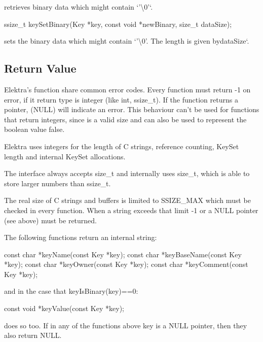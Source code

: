 retrieves binary data which might contain `'\textbackslash{}0'`. \begin{DoxyVerb}    ssize_t keySetBinary(Key *key, const void *newBinary, size_t dataSize);
\end{DoxyVerb}


sets the binary data which might contain `'\textbackslash{}0'{\ttfamily . The length is given by}data\+Size`.

\subsection*{Return Value}

Elektra's function share common error codes. Every function must return {\ttfamily -\/1} on error, if it return type is integer (like {\ttfamily int}, {\ttfamily ssize\+\_\+t}). If the function returns a pointer, {} ({\ttfamily N\+U\+L\+L}) will indicate an error. This behaviour can't be used for functions that return integers, since {} is a valid size and can also be used to represent the boolean value {\ttfamily false}.

Elektra uses integers for the length of C strings, reference counting, {\ttfamily Key\+Set} length and internal {\ttfamily Key\+Set} allocations.

The interface always accepts {\ttfamily size\+\_\+t} and internally uses {\ttfamily size\+\_\+t}, which is able to store larger numbers than {\ttfamily ssize\+\_\+t}.

The real size of C strings and buffers is limited to {\ttfamily S\+S\+I\+Z\+E\+\_\+\+M\+A\+X} which must be checked in every function. When a string exceeds that limit {\ttfamily -\/1} or a {\ttfamily N\+U\+L\+L} pointer (see above) must be returned.

The following functions return an internal string\+: \begin{DoxyVerb}    const char *keyName(const Key *key);
    const char *keyBaseName(const Key *key);
    const char *keyOwner(const Key *key);
    const char *keyComment(const Key *key);
\end{DoxyVerb}


and in the case that {\ttfamily key\+Is\+Binary(key)==0}\+: \begin{DoxyVerb}    const void *keyValue(const Key *key);
\end{DoxyVerb}


does so too. If in any of the functions above {\ttfamily key} is a {\ttfamily N\+U\+L\+L} pointer, then they also return {\ttfamily N\+U\+L\+L}.

